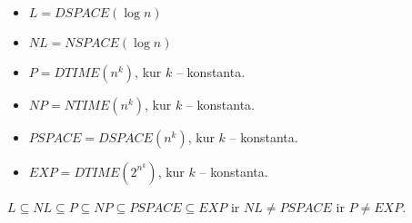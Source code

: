 \begin{defn}
  \hfill \\
  \begin{itemize}
    \item $L = DSPACE(\log n)$
    \item $NL = NSPACE(\log n)$
    \item $P = DTIME(n^k)$, kur $k$ – konstanta.
    \item $NP = NTIME(n^k)$, kur $k$ – konstanta.
    \item $PSPACE = DSPACE(n^k)$, kur $k$ – konstanta.
    \item $EXP = DTIME(2^{n^{k}})$, kur $k$ – konstanta.
  \end{itemize}
\end{defn}

\begin{prop}
  $L \subseteq NL \subseteq P \subseteq NP %
    \subseteq PSPACE \subseteq EXP$
  ir $NL \not = PSPACE$ ir $P \not = EXP$.
\end{prop}
